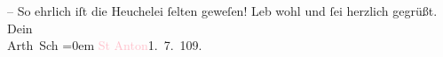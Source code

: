           \pstart
           {\pb}– So ehrlich iſt die
               Heuchelei ſelten geweſen!\pend
           \pstart
           Leb wohl und ſei herzlich gegrüßt.{\\[\baselineskip]}Dein{\\[\baselineskip]}\spacefill\mbox{Arth Sch}\pend
           \leftskip=0em{}\pstart
           \textcolor{pink}{St Anton}{}\ledrightnote{\textcolor{pink}{St. Anton am Arlberg}}{ }1. 7. 109.\pend
           \endnumbering{}  
      